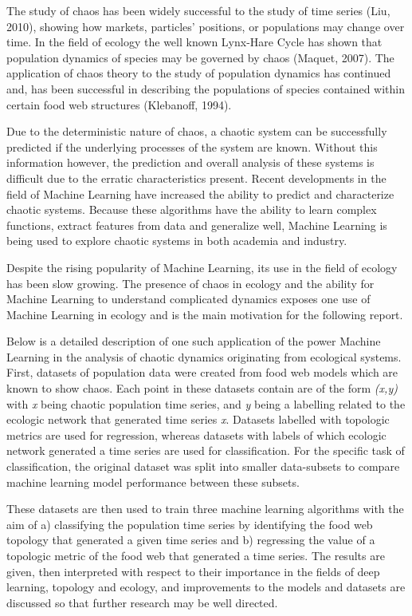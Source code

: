\documentclass[letterpaper, 10 pt, conference]{ieeeconf}  %
\begin{document}
	The study of chaos has been widely successful to the study of time series (Liu, 2010), showing how markets, particles' positions, or populations may change over time. In the field of ecology the well known Lynx-Hare Cycle has shown that population dynamics of species may be governed by chaos (Maquet, 2007). The application of chaos theory to the study of population dynamics has continued and, has been successful in describing the populations of species contained within certain food web structures (Klebanoff, 1994).

	Due to the deterministic nature of chaos, a chaotic system can be successfully predicted if the underlying processes of the system are known. Without this information however, the prediction and overall analysis of these systems is difficult due to the erratic characteristics present. Recent developments in the field of Machine Learning have increased the ability to predict and characterize chaotic systems. Because these algorithms have the ability to learn complex functions, extract features from data and generalize well, Machine Learning is being used to explore chaotic systems in both academia and industry. 
    
	Despite the rising popularity of Machine Learning, its use in the field of ecology has been slow growing. The presence of chaos in ecology and the ability for Machine Learning to understand complicated dynamics exposes one use of Machine Learning in ecology and is the main motivation for the following report.
    
    Below is a detailed description of one such application of the power Machine Learning in the analysis of chaotic dynamics originating from ecological systems. First, datasets of population data were created from food web models which are known to show chaos. Each point in these datasets contain are of the form \textit{(x,y)} with \textit{x} being chaotic population time series, and \textit{y} being a labelling related to the ecologic network that generated time series \textit{x}. Datasets labelled with topologic metrics are used for regression, whereas datasets with labels of which ecologic network generated a time series are used for classification. For the specific task of classification, the original dataset was split into smaller data-subsets to compare machine learning model performance between these subsets. 

    These datasets are then used to train three machine learning algorithms with the aim of a) classifying the population time series by identifying the food web topology that generated a given time series and b) regressing the value of a topologic metric of the food web that generated a time series. The results are given, then interpreted with respect to their importance in the ﬁelds of deep learning, topology and ecology, and improvements to the models and datasets are discussed so that further research may be well directed.
\end{document}
